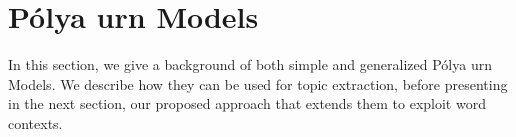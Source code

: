 \documentclass[letterpaper]{article}
\begin{document}








\section{P\'{o}lya urn Models}
In this section, we give a background of both simple and generalized P\'{o}lya urn Models. We describe how they can be used for topic extraction, before presenting in the next section, our proposed approach that extends them to exploit word contexts. 
\end{document}
